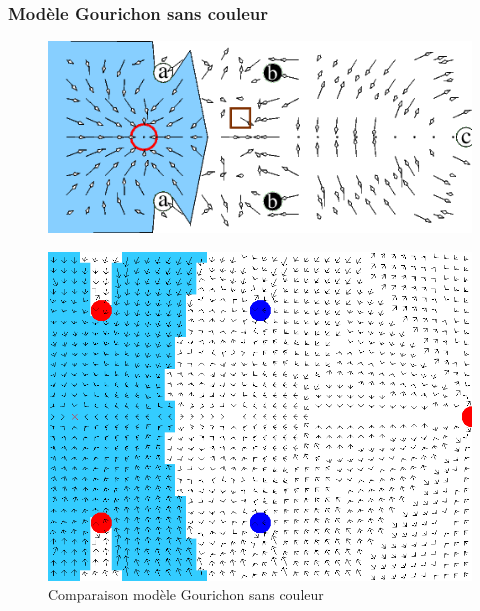 \documentclass{beamer}
\begin{document}
\begin{frame}
  \frametitle{Modèle Gourichon sans couleur}
  \begin{figure}
    \centering
    \includegraphics[scale=0.3]{nocolor_article.png}
  \end{figure}
  \begin{figure}
    \centering
    \includegraphics[scale=0.15]{nocolor_res.png}
    \caption{Comparaison modèle Gourichon sans couleur}
  \end{figure}  
\end{frame}
\end{document}
